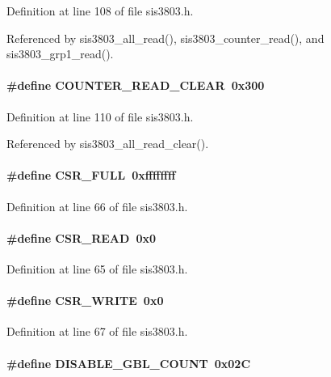 Definition at line 108 of file sis3803.h.

Referenced by sis3803\_\-all\_\-read(), sis3803\_\-counter\_\-read(), and sis3803\_\-grp1\_\-read().
\paragraph[{COUNTER\_\-READ\_\-CLEAR}]{\setlength{\rightskip}{0pt plus 5cm}\#define COUNTER\_\-READ\_\-CLEAR~0x300}\hfill\label{sis3803_8h_acfa3ea5e291f396eb89228e46b40a0d9}


Definition at line 110 of file sis3803.h.

Referenced by sis3803\_\-all\_\-read\_\-clear().
\paragraph[{CSR\_\-FULL}]{\setlength{\rightskip}{0pt plus 5cm}\#define CSR\_\-FULL~0xffffffff}\hfill\label{sis3803_8h_a817f0622ca0dd2c486abb98b68e91b17}


Definition at line 66 of file sis3803.h.
\paragraph[{CSR\_\-READ}]{\setlength{\rightskip}{0pt plus 5cm}\#define CSR\_\-READ~0x0}\hfill\label{sis3803_8h_a5d574c1c714c8ad2807837164e500dac}


Definition at line 65 of file sis3803.h.
\paragraph[{CSR\_\-WRITE}]{\setlength{\rightskip}{0pt plus 5cm}\#define CSR\_\-WRITE~0x0}\hfill\label{sis3803_8h_afeec89b29b3e434512c8233711f834c3}


Definition at line 67 of file sis3803.h.
\paragraph[{DISABLE\_\-GBL\_\-COUNT}]{\setlength{\rightskip}{0pt plus 5cm}\#define DISABLE\_\-GBL\_\-COUNT~0x02C}\hfill\label{sis3803_8h_a8cadd875a8eb626291a422b87cbc314f}


